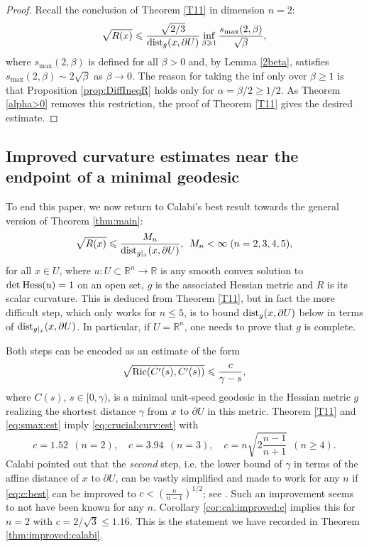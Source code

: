 \documentclass[11pt,reqno]{amsart}
\renewcommand{\leq}{\leqslant}
\renewcommand{\geq}{\geqslant}
\theoremstyle{plain}
\theoremstyle{definition}
\numberwithin{equation}{section}
\begin{document}
\begin{proof}
Recall the conclusion of Theorem \ref{T11} in dimension $n=2$:
$$\sqrt{R(x)}\leq \frac{\sqrt{2/3}}{{\rm dist}_g(x,\partial U)} \inf_{\beta \geq 1} \frac{s_{\max}(2,\beta)}{\sqrt{\beta}},$$
where $s_{\max}(2,\beta)$ is defined for all $\beta > 0$ and, by Lemma \ref{2beta}, satisfies $s_{\max}(2,\beta) \sim 2\sqrt{\beta}$ as $\beta \to 0$. The reason for taking the inf only over $\beta \geq 1$ is that Proposition \ref{prop:DiffIneqR} holds only for $\alpha = \beta/2 \geq 1/2$. As Theorem \ref{alpha>0} removes this restriction, the proof of Theorem \ref{T11} gives the desired estimate.
\end{proof}

\subsection{Improved curvature estimates near the endpoint of a minimal geodesic}

    To end this paper, we now return to Calabi's best result towards the general version of Theorem \ref{thm:main}: 
    $$\sqrt{R(x)} \leq \frac{M_n}{{\rm dist}_{g|_x}(x,\partial U)}, \;\,M_n < \infty \;(n = 2,3,4,5),$$
    for all $x \in U$, where $u: U \subset \mathbb{R}^n \to \mathbb{R}$ is any smooth convex solution to $\det\hspace{0.25mm}{\rm Hess}(u)=1$ on an open set, $g$ is the associated Hessian metric and $R$ is its scalar curvature. This is deduced from Theorem \ref{T11}, but in fact the more difficult step, which only works for $n \leq 5$, is to bound ${\rm dist}_g(x,\partial U)$ below in terms of ${\rm dist}_{g|_x}(x,\partial U)$. In particular, if $U = \mathbb{R}^n$, one needs to prove that $g$ is complete.
    
    Both steps can be encoded as an estimate of the form
    \begin{align}\label{eq:crucial:curv:est}\sqrt{{\rm Ric}(C'(s),C'(s))} \leq \frac{c}{\gamma - s},\end{align}
    where $C(s)$, $s \in [0,\gamma)$, is a minimal unit-speed geodesic in the Hessian metric $g$ realizing the shortest distance $\gamma$ from $x$ to $\partial U$ in this metric. Theorem \ref{T11} and \eqref{eq:smax:est} imply \eqref{eq:crucial:curv:est} with
    \begin{equation}\label{eq:c:best} c = 1.52 \;\,(n = 2), \quad c = 3.94 \;\, (n = 3), \quad c = n\sqrt{2\frac{n-1}{n+1}} \;\,(n \geq 4).\end{equation}
 Calabi pointed out that the \emph{second} step, i.e. the lower bound of $\gamma$ in terms of the affine distance of $x$ to $\partial U$, can be vastly simplified and made to work for any $n$ if \eqref{eq:c:best} can be improved to $c < (\frac{n}{n-1})^{1/2}$; see \cite[p. 122]{EC}. Such an improvement seems to not have been known for any $n$. Corollary \ref{cor:cal:improved:c} implies this for $n = 2$ with $c = 2/\sqrt{3} \leq 1.16$. This is the statement we have recorded in Theorem \ref{thm:improved:calabi}.
\end{document}
